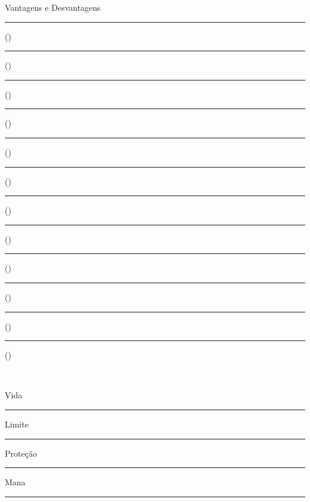 \documentclass[a4paper,12pt]{article}
\begin{document}
	\begin{minipage}[t][][t]{.49\linewidth}
		{\centering Vantagens e Desvantagens \\[\baselineskip]}
		
		\vspace{.18cm}
		\rule{.4\linewidth}{.5pt}(\hspace{.05\linewidth}) \rule{.4\linewidth}{.5pt}(\hspace{.05\linewidth}) \\
		\rule{.4\linewidth}{.5pt}(\hspace{.05\linewidth}) \rule{.4\linewidth}{.5pt}(\hspace{.05\linewidth}) \\
		\rule{.4\linewidth}{.5pt}(\hspace{.05\linewidth}) \rule{.4\linewidth}{.5pt}(\hspace{.05\linewidth}) \\
		\rule{.4\linewidth}{.5pt}(\hspace{.05\linewidth}) \rule{.4\linewidth}{.5pt}(\hspace{.05\linewidth}) \\
		\rule{.4\linewidth}{.5pt}(\hspace{.05\linewidth}) \rule{.4\linewidth}{.5pt}(\hspace{.05\linewidth}) \\
		\rule{.4\linewidth}{.5pt}(\hspace{.05\linewidth}) \rule{.4\linewidth}{.5pt}(\hspace{.05\linewidth}) \\
	\end{minipage} \\

	\begin{minipage}{\linewidth}
		\begin{minipage}{.49\linewidth}
			\Sagittarius \hspace{3pt} Vida \rule{20pt}{.5pt}%
			\hspace{3pt}%
			Limite \rule{20pt}{.5pt}%
			\hspace{3pt}%
			Proteção \rule{20pt}{.5pt}%
			\hspace{3pt}%
		\end{minipage}%
		\hspace{.02\linewidth}%
		\begin{minipage}{.49\linewidth}
		\begin{flushleft}
			\Leo \hspace{3pt} Mana \rule{20pt}{.5pt}
		\end{flushleft}
		\end{minipage}
	\end{minipage} \\
	
\end{document}

